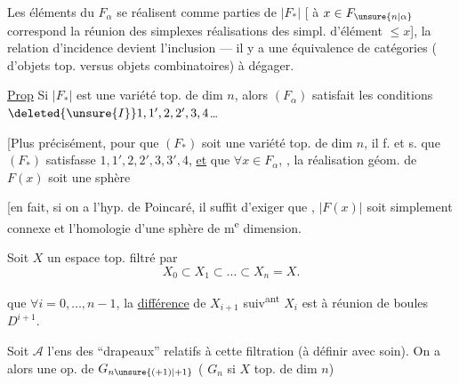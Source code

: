 
Les éléments du $F_\alpha$ se réalisent comme parties  de $|F_*|$ [ à $x\in F_{\unsure{n|\alpha}}$ correspond la réunion des simplexes réalisations des simpl.   d'élément $\leq x$], la relation d'incidence devient l'inclusion --- il y a une équivalence de catégories ( d'objets top. versus objets combinatoires) à dégager.

\uline{Prop} Si $|F_*|$ est une variété top.  de dim $n$, alors $(F_\alpha)$ satisfait les conditions $\deleted{\unsure{I}}1,1',2,2',3,4$\ldots

[Plus précisément, pour que $(F_*)$ soit une variété top. de dim $n$, il f. et s. que $(F_*)$ satisfasse $1,1',2,2',3,3',4$, \uline{et} que $\forall x\in F_\alpha$, , la réalisation géom. de $F(x)$ soit une sphère

[en fait,  si on a l'hyp. de Poincaré, il suffit d'exiger que , $|F(x)|$ soit simplement connexe et   l'homologie d'une sphère de m\textsuperscript{e} dimension.


Soit $X$ un espace top.  filtré par
\[
 X_0\subset X_1\subset\ldots\subset X_n=X.
\]
 

que $\forall i=0,\ldots,n-1$, la \uline{différence} de $X_{i+1}$ suiv\textsuperscript{ant} $X_i$ est   à   réunion de boules $D^{i+1}$.

Soit $\mathcal A$ l'ens des ``drapeaux'' relatifs à cette filtration (à définir avec soin). On a alors une op. de $G_{n\unsure{(+1)|+1}}$ ( $G_n$ si $X$  top. de dim $n$)

